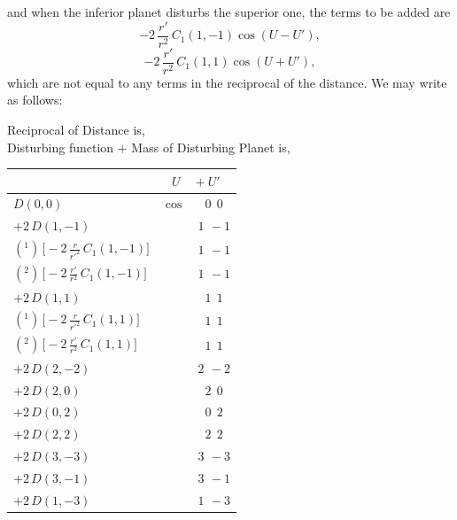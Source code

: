 \documentclass[12pt,a4paper]{article}
\theoremstyle{plain}
\begin{document}
\medskip

\noindent and when the inferior planet disturbs the superior one, the terms to be added are
\[
-2\,\frac{r'}{r^{2}}\,C_{1}(1,-1)\cos(U-U'),
\]
\[
-2\,\frac{r'}{r^{2}}\,C_{1}(1,1)\cos(U+U'),
\]
which are not equal to any terms in the reciprocal of the distance. We may write as follows:

\newpage
{}
\begin{center}
Reciprocal of Distance is,\\[0.5em]
Disturbing function $+$ Mass of Disturbing Planet is,
\end{center}

\begin{center}
\small
\begin{tabular}{|l|c|c|}
\hline
                                                          & \multicolumn{2}{c|}{$U \quad +U'$} \\
\hline
$D(0,0)$                                                  & $\cos$ & $0\ \ 0$ \\
$+2\,D(1,-1)$                                             &        & $1\ \,-1$ \\
$(^{1})\,\bigl[-2\,\tfrac{r}{r'^{2}}\,C_{1}(1,-1)\bigr]$  &        & $1\ \,-1$ \\
$(^{2})\,\bigl[-2\,\tfrac{r'}{r^{2}}\,C_{1}(1,-1)\bigr]$  &        & $1\ \,-1$ \\
$+2\,D(1,1)$                                              &        & $1\ \ 1$ \\
$(^{1})\,\bigl[-2\,\tfrac{r}{r'^{2}}\,C_{1}(1,1)\bigr]$   &        & $1\ \ 1$ \\
$(^{2})\,\bigl[-2\,\tfrac{r'}{r^{2}}\,C_{1}(1,1)\bigr]$   &        & $1\ \ 1$ \\
$+2\,D(2,-2)$                                             &        & $2\ \,-2$ \\
$+2\,D(2,0)$                                              &        & $2\ \ 0$ \\
$+2\,D(0,2)$                                              &        & $0\ \ 2$ \\
$+2\,D(2,2)$                                              &        & $2\ \ 2$ \\
$+2\,D(3,-3)$                                             &        & $3\ \,-3$ \\
$+2\,D(3,-1)$                                             &        & $3\ \,-1$ \\
$+2\,D(1,-3)$                                             &        & $1\ \,-3$ \\

\end{tabular}
\end{center}
\end{document}
